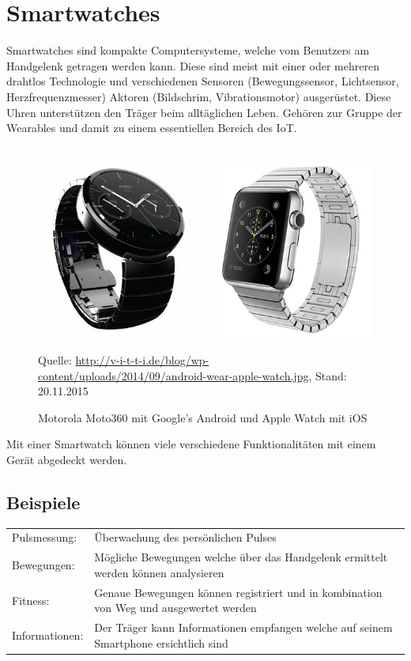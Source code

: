 \section{Smartwatches}
Smartwatches sind kompakte Computersysteme, welche vom Benutzers am Handgelenk getragen werden kann. Diese sind meist mit einer oder mehreren drahtlos Technologie und verschiedenen Sensoren (Bewegungssensor, Lichtsensor, Herzfrequenzmesser) Aktoren (Bildschrim, Vibrationsmotor) ausgerüstet.
Diese Uhren unterstützen den Träger beim alltäglichen Leben. Gehören zur Gruppe der Wearables und damit zu einem essentiellen Bereich des IoT. \\\\
\begin{figure}[h]
  \centering
  \includegraphics[scale=0.6]{98_Bilder/02_Grundlagen/androidwearapplewatch}
  \caption[Google's Android Wear und Apple Watch]{Motorola Moto360 mit Google's Android und Apple Watch mit iOS}
  \footnotesize Quelle: \url{http://v-i-t-t-i.de/blog/wp-content/uploads/2014/09/android-wear-apple-watch.jpg}, Stand: 20.11.2015
\end{figure}


Mit einer Smartwatch können viele verschiedene Funktionalitäten mit einem Gerät abgedeckt werden.
\subsection{Beispiele}
\begin{tabular}{ll}
Pulsmessung: &	Überwachung des persönlichen Pulses \\
Bewegungen:	& Mögliche Bewegungen welche über das Handgelenk ermittelt werden können analysieren \\
Fitness: & Genaue Bewegungen können registriert und in kombination von Weg und ausgewertet werden \\
Informationen: & Der Träger kann Informationen empfangen welche auf seinem Smartphone ersichtlich sind
\end{tabular}

